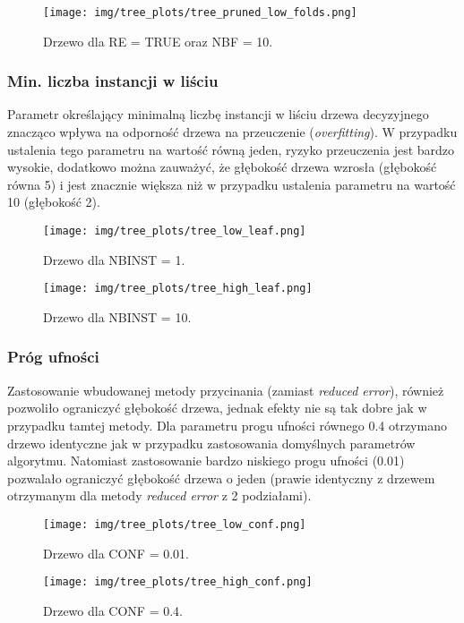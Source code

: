   \begin{figure}[H]
    \center
    \texttt{[image: img/tree\_plots/tree\_pruned\_low\_folds.png]}
    \caption{Drzewo dla RE = TRUE oraz NBF = 10.}
  \end{figure}

  \pagebreak
  \subsubsection*{Min. liczba instancji w liściu}
  Parametr określający minimalną liczbę instancji w liściu drzewa decyzyjnego znacząco
  wpływa na odporność drzewa na przeuczenie (\textit{overfitting}). W przypadku ustalenia
  tego parametru na wartość równą jeden, ryzyko przeuczenia jest bardzo wysokie, dodatkowo
  można zauważyć, że głębokość drzewa wzrosła (głębokość równa 5) i jest znacznie większa 
  niż w przypadku ustalenia parametru na wartość 10 (głębokość 2).
  \begin{figure}[H]
    \center
    \texttt{[image: img/tree\_plots/tree\_low\_leaf.png]}
    \caption{Drzewo dla NBINST = 1.}
  \end{figure}

  \begin{figure}[H]
    \center
    \texttt{[image: img/tree\_plots/tree\_high\_leaf.png]}
    \caption{Drzewo dla NBINST = 10.}
  \end{figure}
 
  \pagebreak
  \subsubsection*{Próg ufności}
  Zastosowanie wbudowanej metody przycinania (zamiast \textit{reduced error}),
  również pozwoliło ograniczyć głębokość drzewa, jednak efekty nie są tak
  dobre jak w przypadku tamtej metody. Dla parametru progu ufności równego
  0.4 otrzymano drzewo identyczne jak w przypadku zastosowania domyślnych parametrów
  algorytmu. Natomiast zastosowanie bardzo niskiego progu ufności (0.01) pozwalało
  ograniczyć głębokość drzewa o jeden (prawie identyczny z drzewem otrzymanym 
  dla metody \textit{reduced error} z 2 podziałami). 
  \begin{figure}[H]
    \center
    \texttt{[image: img/tree\_plots/tree\_low\_conf.png]}
    \caption{Drzewo dla CONF = 0.01.}
  \end{figure}

  \begin{figure}[H]
    \center
    \texttt{[image: img/tree\_plots/tree\_high\_conf.png]}
    \caption{Drzewo dla CONF = 0.4.}
  \end{figure}
